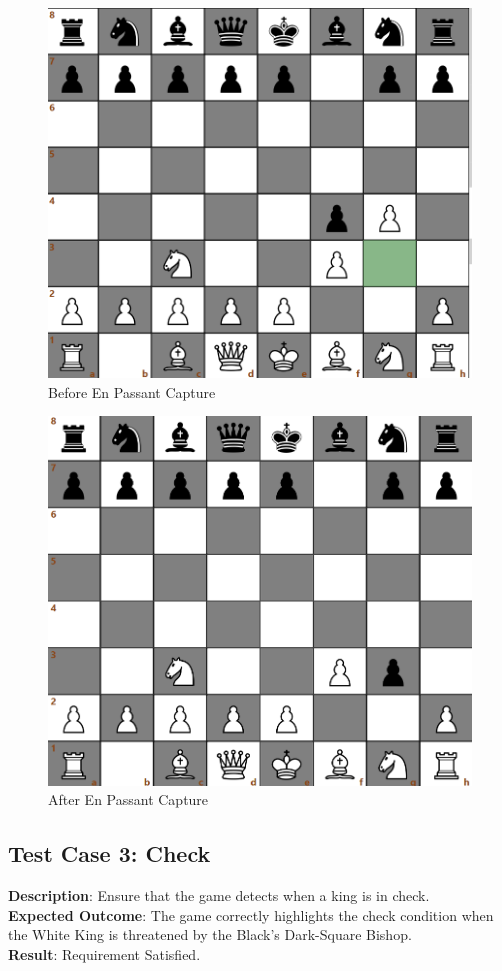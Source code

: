 \documentclass[a4paper,12pt]{article}
\begin{document}
\begin{figure}[H]
    \centering
    \includegraphics[width=0.6\linewidth]{Images/Test Cases/testCase2Img2.png}
    \caption{Before En Passant Capture}
    \label{fig:BeforeEnPassant}
\end{figure}

\begin{figure}[H]
    \centering
    \includegraphics[width=0.6\linewidth]{Images/Test Cases/testCase2Img3.png}
    \caption{After En Passant Capture}
    \label{fig:AfterEnPassant}
\end{figure}

\subsection{Test Case 3: Check}
\textbf{Description}: Ensure that the game detects when a king is in check.\\
\textbf{Expected Outcome}: The game correctly highlights the check condition when the White King is threatened by the Black's Dark-Square Bishop.\\
\textbf{Result}: Requirement Satisfied.
\end{document}

